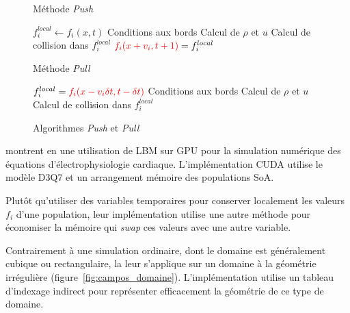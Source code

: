 \begin{figure}[H]
	\centering
	\begin{adjustbox}{center}
		\noindent\begin{minipage}[t]{0.5\linewidth}
			\begin{algorithm}[H]\small
				\label{algo-push}
				\caption{Méthode \textit{Push}}
				\begin{algorithmic}
					\STATE $f^{local}_i \leftarrow f_i(x,t)$
					\ENDFOR
					\STATE Conditions aux bords
					\STATE Calcul de $\rho$ et $u$
					\STATE Calcul de collision dans $f^{local}_i$
					\STATE  ${\color{red}f_i(x+v_i, t +1)} = f^{local}_i$
					\ENDFOR
					\ENDFOR
				\end{algorithmic}
			\end{algorithm}
		\end{minipage}
		\begin{minipage}[t]{0.5\linewidth}
			\begin{algorithm}[H]\small
				\label{algo-pull}
				\caption{Méthode \textit{Pull}}
				\begin{algorithmic} 
					\FORALL{$x \in f_i(x,t)$ } 
					\FORALL{$i$ } 
					\STATE $f^{local}_i = {\color{red} f_i(x-v_i\delta t, t -\delta t)}$
					\ENDFOR
					\STATE Conditions aux bords
					\STATE Calcul de $\rho$ et $u$
					\FORALL{$i$ } 
					\STATE Calcul de collision dans $f^{local}_i$
					\ENDFOR
					\ENDFOR
				\end{algorithmic}
			\end{algorithm}
		\end{minipage}
	\end{adjustbox}
	\caption{Algorithmes \textit{Push} et \textit{Pull}}
	\label{fig:push-pull}
\end{figure} 

\citet{campos_lattice_2016} montrent en \citeyear{campos_lattice_2016} une utilisation de \acs{LBM} sur \acs{GPU} pour la simulation numérique des équations d'électrophysiologie cardiaque. L'implémentation CUDA utilise le modèle D3Q7 et un arrangement mémoire des populations \acs{SoA}.

Plutôt qu'utiliser des variables temporaires pour conserver localement les valeurs $f_i$ d'une population, leur implémentation utilise une autre méthode \cite{latt_technical_2007, mattila_efficient_2007} pour économiser la mémoire qui \textit{swap} ces valeurs avec une autre variable.

Contrairement à une simulation ordinaire, dont le domaine est généralement cubique ou rectangulaire, la leur s'applique sur un domaine à la géométrie irrégulière (figure~\ref{fig:campos_domaine}). L'implémentation utilise un tableau d'indexage indirect pour représenter efficacement la géométrie de ce type de domaine.

